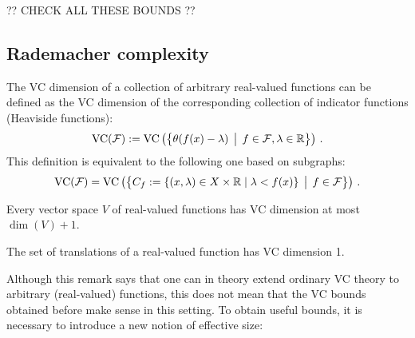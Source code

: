     ?? CHECK ALL THESE BOUNDS ??

\subsection{Rademacher complexity}

    \begin{remark}
        The VC dimension of a collection of arbitrary real-valued functions can be defined as the VC dimension of the corresponding collection of indicator functions (Heaviside functions):
        \begin{gather}
            \mathrm{VC}(\mathcal{F}) := \mathrm{VC}\left(\bigl\{\theta(f(x)-\lambda)\,\bigm\vert\,f\in\mathcal{F},\lambda\in\mathbb{R}\bigr\}\right)\,.
        \end{gather}
        This definition is equivalent to the following one based on subgraphs:
        \begin{gather}
            \mathrm{VC}(\mathcal{F}) = \mathrm{VC}\left(\bigl\{C_f:=\{(x,\lambda)\in X\times\mathbb{R}\mid\lambda<f(x)\}\,\bigm\vert\,f\in\mathcal{F}\bigr\}\right)\,.
        \end{gather}
    \end{remark}

    \begin{example}
        Every vector space $V$ of real-valued functions has VC dimension at most $\dim(V)+1$.
    \end{example}
    \begin{example}[Translations]
        The set of translations of a real-valued function has VC dimension 1.
    \end{example}

    Although this remark says that one can in theory extend ordinary VC theory to arbitrary (real-valued) functions, this does not mean that the VC bounds obtained before make sense in this setting. To obtain useful bounds, it is necessary to introduce a new notion of effective size:

